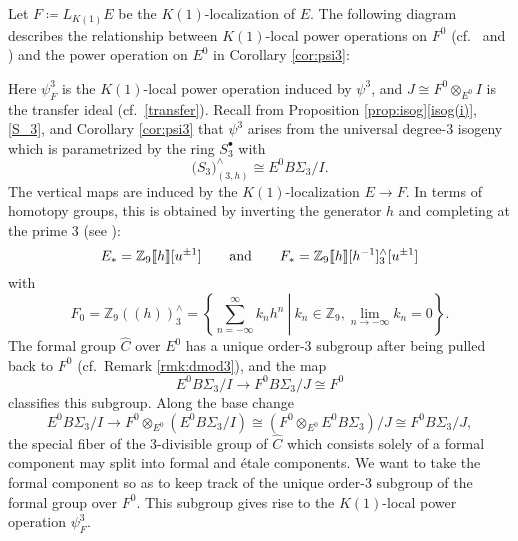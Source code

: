 \documentclass{gtpart}
\theoremstyle{definition}
\theoremstyle{remark}
\newcommand{\mb}[1]{\mathbb{#1}}
\newcommand{\BZ}{{\mb Z}}
\newcommand{\HC}{\widehat{C}}
\newcommand{\ad}{{\rm and}}
\newcommand{\p}{\psi^3}
\newcommand{\s}{S^\bullet}
\newcommand{\isog}[1]{Proposition \ref{prop:isog}\thinspace \eqref{isog(#1)}}
\begin{document}
Let $F \coloneqq L_{K(1)} E$ be the $K(1)$-localization of $E$.  The 
following diagram describes the relationship between $K(1)$-local power 
operations on $F^0$ (cf.~\cite[Section 3]{hopkins} and 
\cite[Section IX.3]{H_infty}) and the power operation on $E^0$ in 
Corollary \ref{cor:psi3}: 
\begin{center}
\end{center}
Here $\psi_F^3$ is the $K(1)$-local power operation induced by $\p$, and 
$J \cong F^0 \otimes_{E^0} I$ is the transfer ideal 
(cf.~\eqref{transfer}).  Recall from \isog{i}, \eqref{S_3}, and 
Corollary \ref{cor:psi3} that $\p$ arises from the universal degree-3 
isogeny which is parametrized by the ring $\s_3$ with 
\[
 \big( S_3 \big)_{(3,h)}^\wedge \cong E^0 B\Sigma_3 / I.  
\]
The vertical maps are induced by the $K(1)$-localization $E \to F$.  In 
terms of homotopy groups, this is obtained by inverting the generator 
$h$ and completing at the prime 3 (see \cite[Corollary 1.5.5]{hovey}): 
\[
 E_* = \BZ_9 \llbracket h \rrbracket [u^{\pm1}] \qquad \ad \qquad F_* = \BZ_9 \llbracket h \rrbracket [h^{-1}]_3^\wedge [u^{\pm1}] 
\]
with 
\[
 F_0 = \BZ_9 (\!(h)\!)_3^\wedge = \left.\left\{\sum_{n = -\infty}^{\infty} k_n h^n~\right|~k_n \in \BZ_9, \lim_{n \to -\infty} k_n = 0\right\}.  
\]
The formal group $\HC$ over $E^0$ has a unique order-3 subgroup after 
being pulled back to $F^0$ (cf.~Remark \ref{rmk:dmod3}), and the map 
\[
 E^0 B\Sigma_3 / I \to F^0 B\Sigma_3 / J \cong F^0 
\]
classifies this subgroup.  Along the base change 
\[
 E^0 B\Sigma_3 / I \to F^0 \otimes_{E^0} (E^0 B\Sigma_3 / I) \cong (F^0 \otimes_{E^0} E^0 B\Sigma_3) / J \cong F^0 B\Sigma_3 / J, 
\]
the special fiber of the 3-divisible group of $\HC$ which consists 
solely of a formal component may split into formal and \'etale 
components.  We want to take the formal component so as to keep track of 
the unique order-3 subgroup of the formal group over $F^0$.  This 
subgroup gives rise to the $K(1)$-local power operation $\psi_F^3$.  
\end{document}
